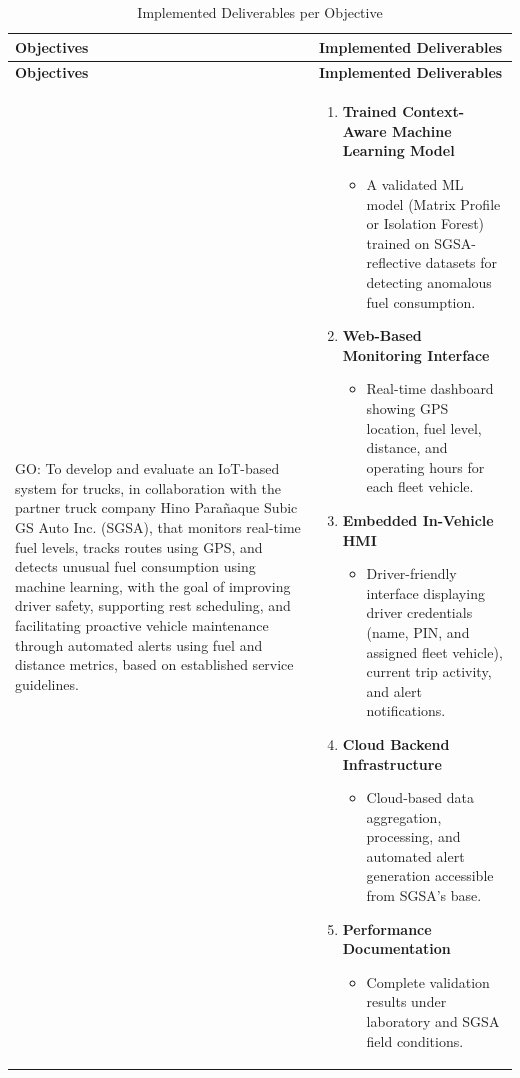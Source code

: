 \begin{SingleSpace} %
\renewcommand{\arraystretch}{1} %
\scriptsize %
\begin{longtable}{|p{}|p{}|}
\caption{Implemented Deliverables per Objective} \label{tab:expected_deliverables} \\
\hline
\textbf{Objectives} & \textbf{Implemented Deliverables} \\
\hline
\endfirsthead

\hline
\textbf{Objectives} & \textbf{Implemented Deliverables} \\
\hline
\endhead

GO: To develop and evaluate an IoT-based system for trucks, in collaboration with the partner truck company Hino Parañaque Subic GS Auto Inc. (SGSA), that monitors real-time fuel levels, tracks routes using GPS, and detects unusual fuel consumption using machine learning, with the goal of improving driver safety, supporting rest scheduling, and facilitating proactive vehicle maintenance through automated alerts using fuel and distance metrics, based on established service guidelines. &
\begin{enumerate}
    \item \textbf{Trained Context-Aware Machine Learning Model}
    \begin{itemize}
        \item A validated ML model (Matrix Profile or Isolation Forest) trained on SGSA-reflective datasets for detecting anomalous fuel consumption.
    \end{itemize}
    \item \textbf{Web-Based Monitoring Interface}
    \begin{itemize}
        \item Real-time dashboard showing GPS location, fuel level, distance, and operating hours for each fleet vehicle.
    \end{itemize}
    \item \textbf{Embedded In-Vehicle HMI}
    \begin{itemize}
        \item Driver-friendly interface displaying driver credentials (name, PIN, and assigned fleet vehicle), current trip activity, and alert notifications.
    \end{itemize}
    \item \textbf{Cloud Backend Infrastructure}
    \begin{itemize}
        \item Cloud-based data aggregation, processing, and automated alert generation accessible from SGSA’s base.
    \end{itemize}
    \item \textbf{Performance Documentation}
    \begin{itemize}
        \item Complete validation results under laboratory and SGSA field conditions.
    \end{itemize}
\end{enumerate} \\
\hline


\end{longtable}
\end{SingleSpace}
